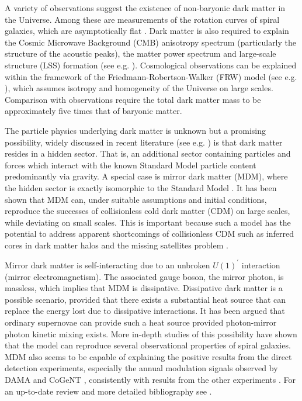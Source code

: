 \documentclass[12pt]{article}
\begin{document}
A variety of observations suggest the existence of non-baryonic dark matter in the Universe. Among these are measurements of the rotation curves of spiral galaxies, which are asymptotically flat \cite{rubin}. Dark matter is also required to explain the Cosmic Microwave Background (CMB) anisotropy spectrum (particularly the structure of the acoustic peaks), the matter power spectrum and large-scale structure (LSS) formation (see e.g. \cite{refregier}). Cosmological observations can be explained within the framework of the Friedmann-Robertson-Walker (FRW) model (see e.g. \cite{dodelson}), which assumes isotropy and homogeneity of the Universe on large scales. Comparison with observations require the total dark matter mass to be approximately five times that of baryonic matter.

The particle physics underlying dark matter is unknown but a promising possibility, widely discussed in recent literature (see e.g. \cite{feng,cline6,ringwald,broken}) is that dark matter resides in a hidden sector. That is, an additional sector containing particles and forces which interact with the known Standard Model particle content predominantly via gravity. A special case is mirror dark matter (MDM), where the hidden sector is exactly isomorphic to the Standard Model \cite{fundamentalimproper}. It has been shown that MDM can, under suitable assumptions and initial conditions, reproduce the successes of collisionless cold dark matter (CDM) on large scales, while deviating on small scales. This is important because such a model has the potential to address apparent shortcomings of collisionless CDM such as inferred cores in dark matter halos and the missing satellites problem \cite{berezhiani,mirrormattertype}.

Mirror dark matter is self-interacting due to an unbroken $U(1) ^{'}$ interaction (mirror electromagnetism). The associated gauge boson, the mirror photon, is massless, which implies that MDM is dissipative. Dissipative dark matter is a possible scenario, provided that there exists a substantial heat source that can replace the energy lost due to dissipative interactions. It has been argued \cite{spheroidal} that ordinary supernovae can provide such a heat source provided photon-mirror photon kinetic mixing exists. More in-depth studies of this possibility \cite{depth4} have shown that the model can reproduce several observational properties of spiral galaxies. MDM also seems to be capable of explaining the positive results from the direct detection experiments, especially the annual modulation signals observed by DAMA \cite{dama1} and CoGeNT \cite{cogent}, consistently with results from the other experiments \cite{dama,electronscattering}. For an up-to-date review and more detailed bibliography see \cite{review}.
\end{document}
